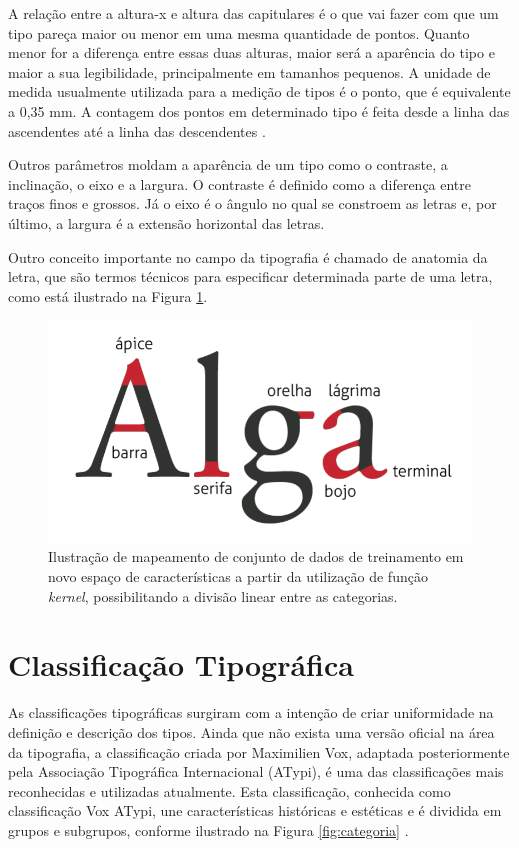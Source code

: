 A relação entre a altura-x e altura das capitulares é o que vai fazer com que um tipo pareça maior ou menor em uma mesma quantidade de pontos. Quanto menor for a diferença entre essas duas alturas, maior será a aparência do tipo e maior a sua legibilidade, principalmente em tamanhos pequenos. A unidade de medida usualmente utilizada para a medição de tipos é o ponto, que é equivalente a 0,35 mm.  A contagem dos pontos em determinado tipo é feita desde a linha das ascendentes até a linha das descendentes .

Outros parâmetros moldam a aparência de um tipo como o contraste, a inclinação, o eixo e a largura. O contraste é definido como a diferença entre traços finos e grossos. Já o eixo é o ângulo no qual se constroem as letras e, por último, a largura é a extensão horizontal das letras.

Outro conceito importante no campo da tipografia é chamado de anatomia da letra, que são termos técnicos para especificar determinada parte de uma letra, como está ilustrado na Figura \ref{fig:anatomia}.

\begin{figure}[H]
 \centering
  \includegraphics[width=0.45\linewidth]{figuras/anatomia.pdf}
  \caption{Ilustração de mapeamento de conjunto de dados de treinamento em novo espaço de características a partir da utilização de função \textit{kernel}, possibilitando a divisão linear entre as categorias.}
  \label{fig:anatomia}
\end{figure}

\section{Classificação Tipográfica}

As classificações tipográficas surgiram com a intenção de criar uniformidade na definição e descrição dos tipos. Ainda que não exista uma versão oficial na área da tipografia, a classificação criada por Maximilien Vox, adaptada posteriormente pela Associação Tipográfica Internacional (ATypi), é uma das classificações mais reconhecidas e utilizadas atualmente. Esta classificação,  conhecida como classificação Vox ATypi, une características históricas e estéticas e é dividida em grupos e subgrupos, conforme ilustrado na Figura \ref{fig:categoria} .

